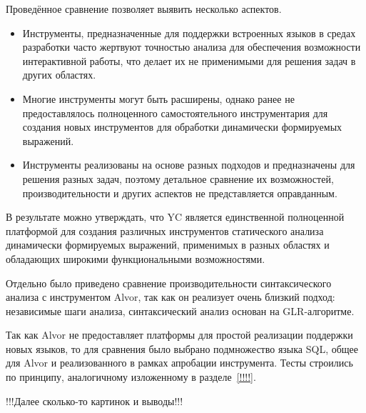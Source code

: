 Проведённое сравнение позволяет выявить несколько аспектов.
\begin{itemize}
    \item Инструменты, предназначенные для поддержки встроенных языков в средах разработки часто жертвуют точностью анализа для обеспечения возможности интерактивной работы, что делает их не применимыми для решения задач в других областях.
    \item Многие инструменты могут быть расширены, однако ранее не предоставлялось полноценного самостоятельного инструментария для создания новых инструментов для обработки динамически формируемых выражений.
    \item Инструменты реализованы на основе разных подходов и предназначены для решения разных задач, поэтому детальное сравнение их возможностей, производительности и других аспектов не представляется оправданным.
\end{itemize}

В результате можно утверждать, что YC является единственной полноценной платформой для создания различных инструментов статического анализа динамически формируемых выражений, применимых в разных областях и обладающих широкими функциональными возможностями.

Отдельно было приведено сравнение производительности синтаксического анализа с инструментом Alvor, так как он реализует очень близкий подход: независимые шаги анализа, синтаксический анализ основан на GLR-алгоритме.

Так как Alvor не предоставляет платформы для простой реализации поддержки новых языков, то для сравнения было выбрано подмножество языка SQL, общее для Alvor и реализованного в рамках апробации инструмента. Тесты строились по принципу, аналогичному изложенному в разделе~\ref{!!!!}.

!!!Далее сколько-то картинок и выводы!!!
